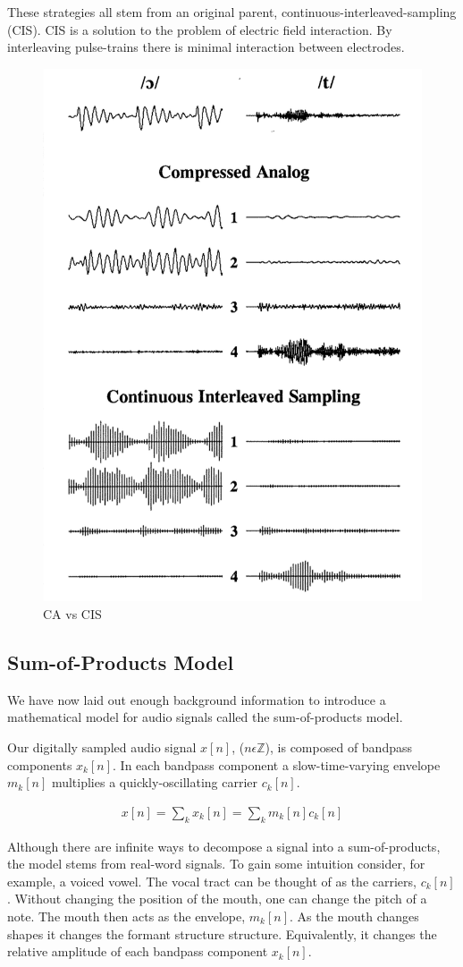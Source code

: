 \documentclass [11pt, proquest,oneside] {ganter_thesis}[2015/03/03]
\begin{document}
These strategies all stem from an original parent, continuous-interleaved-sampling (CIS).  CIS is a solution to the problem of electric field interaction.  By interleaving pulse-trains there is minimal interaction between electrodes.


\begin{figure}[!ht]
  \centering
    \includegraphics[width=.5\textwidth]{caVScis}   
    \caption{CA vs CIS}
\end{figure}

\subsection{Sum-of-Products Model}

We have now laid out enough background information to introduce a mathematical model for audio signals called the sum-of-products model.

Our digitally sampled audio signal $x[n]$, ($n \epsilon \mathbb{Z}$), is composed of bandpass components $x_k[n]$.  In each bandpass component a slow-time-varying envelope $m_k[n]$ multiplies a quickly-oscillating carrier $c_k[n]$.

\begin{align}
\label{eq:sum-of-products}
x[n] = \sum\limits_k x_k[n] = \sum\limits_k m_k[n] c_k[n]
\end{align}

Although there are infinite ways to decompose a signal into a sum-of-products, the model stems from real-word signals.  To gain some intuition consider, for example, a voiced vowel.  The vocal tract can be thought of as the carriers, $c_k[n]$.  Without changing the position of the mouth, one can change the pitch of a note.  The mouth then acts as the envelope, $m_k[n]$.  As the mouth changes shapes it changes the formant structure structure.  Equivalently, it changes the relative amplitude of each bandpass component $x_k[n]$.
\end{document}
